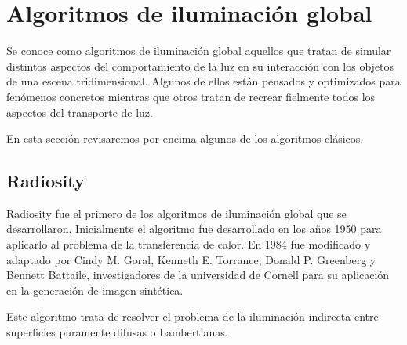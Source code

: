 \section{Algoritmos de iluminación global}

Se conoce como algoritmos de iluminación global aquellos que tratan de simular distintos aspectos del comportamiento de la luz en su interacción con los objetos de una escena tridimensional. Algunos de ellos están pensados y optimizados para fenómenos concretos mientras que otros tratan de recrear fielmente todos los aspectos del transporte de luz.

En esta sección revisaremos por encima algunos de los algoritmos clásicos.

 
\subsection{Radiosity}

Radiosity fue el primero de los algoritmos de iluminación global que se desarrollaron. Inicialmente el algoritmo fue desarrollado en los años 1950 para aplicarlo al problema de la transferencia de calor. En 1984 fue modificado y adaptado por \nocite{Goral1984} Cindy M. Goral, Kenneth E. Torrance, Donald P. Greenberg y Bennett Battaile, investigadores de la universidad de Cornell para su aplicación en la generación de imagen sintética.

Este algoritmo trata de resolver el problema de la iluminación indirecta entre superficies puramente difusas o Lambertianas.
